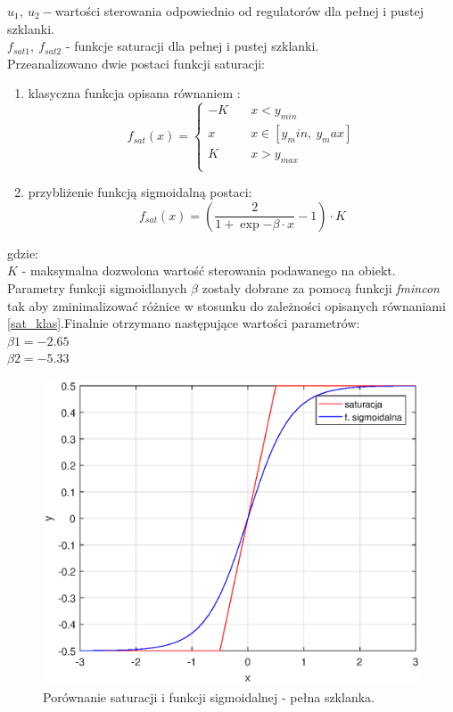 $u_1, \ u_2 - $wartości sterowania odpowiednio od regulatorów dla pełnej i pustej szklanki.\\
$f_{sat1}, \ f_{sat2}$ - funkcje saturacji dla pełnej i pustej szklanki.
 \\
 Przeanalizowano dwie postaci funkcji saturacji: 
 \begin{enumerate}
 	\item klasyczna funkcja opisana równaniem :
 	\begin{equation}\label{sat_klas}
 	f_{sat}(x) = 
 	\begin{cases}
 	-K       & \quad x < y_{min}\\
 	x  & \quad x \in [y_min, \ y_max]\\
 	K       & \quad x > y_{max}\\
 	\end{cases}
 	\end{equation}
 	\item przybliżenie funkcją sigmoidalną postaci:
 	\begin{equation}\label{key}
 	f_{sat}(x) = (\dfrac{2}{1+\exp{-\beta \cdot x}} - 1) \cdot K
 	\end{equation}
 \end{enumerate}
gdzie:\\
$K$ - maksymalna dozwolona wartość sterowania podawanego na obiekt.\\
Parametry funkcji sigmoidlanych $\beta$ zostały dobrane za pomocą funkcji \textit{fmincon} tak aby zminimalizować różnice w stosunku do zależności opisanych równaniami \ref{sat_klas}.Finalnie otrzymano następujące wartości parametrów:\\
$\beta1 = -2.65$\\
$\beta2 = -5.33$\\

\begin{figure}[h!]
	\centering
	\includegraphics[scale = 0.8]{fig/por_sat_1.eps}
	\caption		
	{Porównanie saturacji i funkcji sigmoidalnej - pełna szklanka.}
	\label{por_sat1}
\end{figure} 


